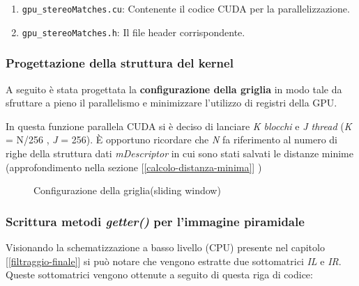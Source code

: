 \documentclass[12pt,a4paper]{report}
\begin{document}
\begin{enumerate}
    \item \texttt{gpu\_stereoMatches.cu}: Contenente il codice CUDA per la parallelizzazione.
    \item \texttt{gpu\_stereoMatches.h}: Il file header corrispondente.
\end{enumerate}

\vspace{1cm}

\subsubsection{Progettazione della struttura del kernel}

A seguito è stata progettata la \textbf{configurazione della griglia} in modo tale da sfruttare
a pieno il parallelismo e minimizzare l'utilizzo di registri della GPU.

In questa funzione parallela CUDA si è deciso di lanciare \textit{K blocchi} e \textit{J thread} (\textit{K} = N/256 , \textit{J} = 256).
È opportuno ricordare che \textit{N} fa riferimento al numero di righe della struttura dati \textit{mDescriptor} in cui sono stati salvati le distanze minime (approfondimento nella sezione  [\ref{calcolo-distanza-minima}] )

\begin{figure}[H]
    \centering
    \caption{Configurazione della griglia(sliding window) }
\end{figure}

\subsubsection{Scrittura metodi \textit{getter()} per l'immagine piramidale}

Visionando la schematizzazione a basso livello (CPU) presente nel capitolo [\ref{filtraggio-finale}] si può notare che vengono estratte due sottomatrici \textit{IL} e \textit{IR}. 
Queste sottomatrici vengono ottenute a seguito di questa riga di codice:
\end{document}
